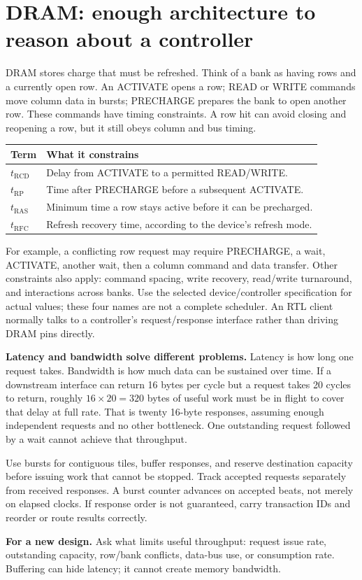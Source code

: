 \documentclass[11pt]{article}
\newcommand{\transfer}[1]{\par\textbf{For a new design.} #1\par}
\begin{document}
\section{DRAM: enough architecture to reason about a controller}\label{sec:dram}
DRAM stores charge that must be refreshed. Think of a bank as having rows and a currently open row.
An ACTIVATE opens a row; READ or WRITE commands move column data in bursts; PRECHARGE prepares the bank to open another row.
These commands have timing constraints. A row hit can avoid closing and reopening a row, but it still obeys column and bus timing.

\begin{longtable}{@{}L{3cm}L{13cm}@{}}
\toprule Term & What it constrains \\ \midrule\endhead
\(t_{\mathrm{RCD}}\) & Delay from ACTIVATE to a permitted READ/WRITE.\\
\(t_{\mathrm{RP}}\) & Time after PRECHARGE before a subsequent ACTIVATE.\\
\(t_{\mathrm{RAS}}\) & Minimum time a row stays active before it can be precharged.\\
\(t_{\mathrm{RFC}}\) & Refresh recovery time, according to the device's refresh mode.\\
\bottomrule
\end{longtable}
For example, a conflicting row request may require PRECHARGE, a wait, ACTIVATE, another wait, then a column command and data transfer.
Other constraints also apply: command spacing, write recovery, read/write turnaround, and interactions across banks.
Use the selected device/controller specification for actual values; these four names are not a complete scheduler.
An RTL client normally talks to a controller's request/response interface rather than driving DRAM pins directly.

\textbf{Latency and bandwidth solve different problems.}
Latency is how long one request takes. Bandwidth is how much data can be sustained over time.
If a downstream interface can return 16 bytes per cycle but a request takes 20 cycles to return,
roughly \(16\times20=320\) bytes of useful work must be in flight to cover that delay at full rate.
That is twenty 16-byte responses, assuming enough independent requests and no other bottleneck.
One outstanding request followed by a wait cannot achieve that throughput.

Use bursts for contiguous tiles, buffer responses, and reserve destination capacity before issuing work that cannot be stopped.
Track accepted requests separately from received responses. A burst counter advances on accepted beats, not merely on elapsed clocks.
If response order is not guaranteed, carry transaction IDs and reorder or route results correctly.
\transfer{Ask what limits useful throughput: request issue rate, outstanding capacity, row/bank conflicts, data-bus use, or consumption rate.
Buffering can hide latency; it cannot create memory bandwidth.}
\end{document}
